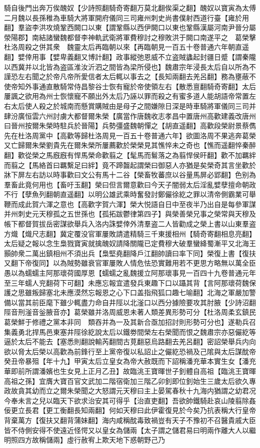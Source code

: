 騎自後門出奔万俟醜奴【少詩照翻騎奇寄翻万莫北翻俟渠之翻】醜奴以寶寅為太傅二月魏以長孫稚為車騎大將軍開府儀同三司雍州刺史尚書僕射西道行臺【雍於用翻】羣盜李洪攻燒鞏西闕口以東【謂鞏縣以西伊闕口以東也鞏縣漢屬河南尹晉分屬滎陽郡】南結諸蠻魏都督李神軌武衛將軍費穆討之穆敗洪于闕口南遂平之　葛榮擊杜洛周殺之併其衆　魏靈太后再臨朝以來【再臨朝見一百五十卷普通六年朝直遥翻】嬖倖用事【嬖卑義翻又博計翻】政事縱弛恩威不立盗賊蠭起封疆日蹙【謂秦隴以西冀并以北皆為盗區淮汝沂泗之間皆為梁所侵也】魏肅宗年浸長太后自以所為不謹恐左右聞之於帝凡帝所愛信者太后輒以事去之【長知兩翻去羌呂翻】務為壅蔽不使帝知外事通直散騎常侍昌黎谷士恢有寵於帝使領左右【散悉亶翻騎奇寄翻】太后屢諷之欲用為州士恢懷寵不願出外太后乃誣以罪而殺之有蜜多道人能胡語帝常置左右太后使人殺之於城南而懸賞購賊由是母子之間嫌隙日深是時車騎將軍儀同三司并肆汾廣恒雲六州討虜大都督爾朱榮【廣當作唐魏收志孝昌中置唐州高歡建義改唐州曰晉州按爾朱榮時駐兵於晉陽】兵勢彊盛魏朝憚之【胡直遥翻】高歡段榮尉景蔡儁先在杜洛周黨中【高歡等歸杜洛周見一百五十卷普通六年】欲圖洛周不果逃奔葛榮又亡歸爾朱榮劉貴先在爾朱榮所屢薦歡於榮榮見其憔悴未之奇也【憔而遥翻悴秦醉翻】歡從榮之馬廐廐有悍馬榮命歡翦之【髦馬而鬄落之為翦悍侯旰翻】歡不加羈絆而翦之【馬絡首曰羈繫足曰絆】竟不蹄齧起謂榮曰御惡人亦猶是矣榮奇其言坐歡於牀下屏左右訪以時事歡曰文公有馬十二谷【榮畜牧蕃庶以谷量馬屏必郢翻】色别為羣畜此竟何用也【畜吁玉翻】榮曰但言爾意歡曰今天子闇弱太后淫亂嬖孽擅命朝政不行【孽魚列翻朝直遥翻】以明公雄武乘時奮發討鄭儼徐紇之罪以清帝側霸業可舉鞭而成此賀六渾之意也【高歡字賀六渾】榮大悦語自日中至夜半乃出自是每參軍謀并州刺史元天穆孤之五世孫也【孤拓跋鬱律第四子】與榮善榮兄事之榮常與天穆及帳下都督賀拔岳密謀欲舉兵入洛内誅嬖倖外清羣盗二人皆勸成之榮上書以山東羣盗方熾【熾尺志翻】冀定覆没官軍屢敗請遣精騎三千東援相州【騎奇寄翻相息亮翻】太后疑之報以念生梟戮寶寅就擒醜奴請降關隴已定費穆大破羣蠻絳蜀漸平又北海王顥帥衆二萬出鎮相州不須出兵【梟堅堯翻降戶江翻帥讀曰率下同】榮復上書【復扶又翻下帝復同】以為賊勢雖衰官軍屢敗人情危怯恐實難用若不更思方略無以萬全臣愚以為蠕蠕主阿那瓌荷國厚恩【蠕蠕之亂魏援立阿那瓌事見一百四十九卷普通元年至三年蠕人兖翻荷下可翻】未應忘報宜遣發兵東趣下口以躡其背【言阿那瓌荷魏保護之思雖叛歸塞北未應漠然忘報恩之心下口盖指飛狐口趣七喻翻】北海之軍嚴加警備以當其前臣麾下雖少輒盡力命自井陘以北滏口以西分據險要攻其肘腋【少詩沼翻陘音刑滏音釡腋音亦】葛榮雖并洛周威恩未著人類差異形勢可分【杜洛周柔玄鎮民葛榮鮮于修禮之黨本非同　類吞并為一及其新合亟加招討則形勢可分也】遂勒兵召集義勇北捍馬邑東塞井陘徐紇說太后以鐵劵間榮左右榮聞而恨之魏肅宗亦惡儼紇等逼於太后不能去【塞悉則翻說輸芮翻間古莧翻惡烏路翻去羌呂翻】密詔榮舉兵内向欲以脅太后榮以高歡為前鋒行至上黨帝復以私詔止之儼紇恐禍及己隂與太后謀酖帝癸丑帝暴殂【年十九】甲寅太后立皇女為帝大赦既而下詔稱潘充華本實生女【潘充華即前所謂潘嬪也生女見上正月乙丑】故臨洮王寶暉世子釗體自高祖【臨洮王寶暉高祖之孫】宜膺大寶百官文武加二階宿衛加三階乙卯釗即位釗始生三歲太后欲久專政故貪其幼而立之爾朱榮聞之大怒謂元天穆曰主上晏駕春秋十九海内猶謂之幼君况今奉未言之兒以臨天下欲求治安其可得乎【治直吏翻】吾欲帥鐵騎赴哀山陵翦除姦佞更立長君【更工衡翻長知兩翻】何如天穆曰此伊霍復見於今矣乃抗表稱大行皇帝背棄萬方【復扶又翻背蒲妹翻】海内咸稱酖毒致禍豈有天子不豫初不召醫貴戚大臣皆不侍側安得不使遠近怪愕又以皇女為儲兩【太子謂之儲君易曰明兩作離大人以繼明照四方故稱儲兩】虛行赦宥上欺天地下惑朝野己乃